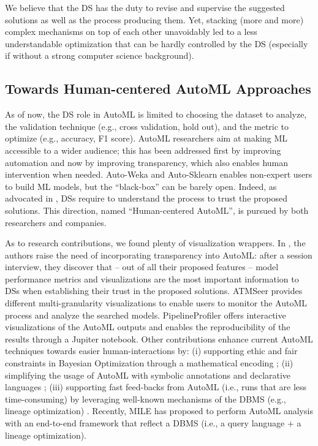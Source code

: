 We believe that the DS has the duty to revise and supervise the suggested solutions as well as the process producing them.
Yet, stacking (more and more) complex mechanisms on top of each other unavoidably led to a less understandable optimization that can be hardly controlled by the DS (especially if without a strong computer science background).

\subsection{Towards Human-centered AutoML Approaches}
As of now, the DS role in AutoML is limited to choosing the dataset to analyze, the validation technique (e.g., cross validation, hold out), and the metric to optimize (e.g., accuracy, F1 score).
AutoML researchers aim at making ML accessible to a wider audience;
this has been addressed first by improving automation and now by improving transparency, which also enables human intervention when needed.
Auto-Weka \cite{kotthoff2019auto} and Auto-Sklearn \cite{feurer2019auto} enables non-expert users to build ML models, but the ``black-box'' can be barely open.
Indeed, as advocated in \cite{drozdal2020trust}, DSs require to understand the process to trust the proposed solutions.
This direction, named ``Human-centered AutoML'', is pursued by both researchers and companies.

As to research contributions, we found plenty of visualization wrappers.
In \cite{drozdal2020trust}, the authors raise the need of incorporating transparency into AutoML: after a session interview, they discover that -- out of all their proposed features -- model performance metrics and visualizations are the most important information to DSs when establishing their trust in the proposed solutions.
ATMSeer \cite{wang2019atmseer} provides different multi-granularity visualizations to enable users to monitor the AutoML process and analyze the searched models.
PipelineProfiler \cite{ono2020pipelineprofiler} offers interactive visualizations of the AutoML outputs and enables the reproducibility of the results through a Jupiter notebook.
Other contributions enhance current AutoML techniques towards easier human-interactions by: (i) supporting ethic and fair constraints in Bayesian Optimization through a mathematical encoding \cite{perrone2021fair, yaghini2021human}; (ii) simplifying the usage of AutoML with symbolic annotations \cite{peng2020pyglove} and declarative languages \cite{kraska2013mlbase}; (iii) supporting fast feed-backs from AutoML (i.e., runs that are less time-consuming) by leveraging well-known mechanisms of the DBMS (e.g., lineage optimization) \cite{vartak2015supporting, xin2018accelerating}.
Recently, MILE \cite{lee2020human} has proposed to perform AutoML analysis with an end-to-end framework that reflect a DBMS (i.e., a query language + a lineage optimization).

